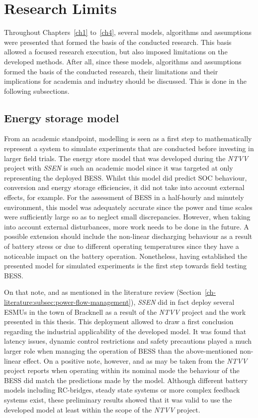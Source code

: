 \section{Research Limits}
\label{ch-conclusions:sec:research-limits}

Throughout Chapters~\ref{ch1} to~\ref{ch4}, several models, algorithms and assumptions were presented that formed the basis of the conducted research.
This basis allowed a focused research execution, but also imposed limitations on the developed methods.
After all, since these models, algorithms and assumptions formed the basis of the conducted research, their limitations and their implications for academia and industry should be discussed.
This is done in the following subsections.

\subsection{Energy storage model}

From an academic standpoint, modelling is seen as a first step to mathematically represent a system to simulate experiments that are conducted before investing in larger field trials.
The energy store model that was developed during the \textit{NTVV} project with \textit{SSEN} is such an academic model since it was targeted at only representing the deployed BESS.
Whilst this model did predict SOC behaviour, conversion and energy storage efficiencies, it did not take into account external effects, for example.
For the assessment of BESS in a half-hourly and minutely environment, this model was adequately accurate since the power and time scales were sufficiently large so as to neglect small discrepancies.
However, when taking into account external disturbances, more work needs to be done in the future.
A possible extension should include the non-linear discharging behaviour as a result of battery stress or due to different operating temperatures since they have a noticeable impact on the battery operation.
Nonetheless, having established the presented model for simulated experiments is the first step towards field testing BESS.

On that note, and as mentioned in the literature review (Section~\ref{ch-literature:subsec:power-flow-management}), \textit{SSEN} did in fact deploy several ESMUs in the town of Bracknell as a result of the \textit{NTVV} project and the work presented in this thesis.
This deployment allowed to draw a first conclusion regarding the industrial applicability of the developed model.
It was found that latency issues, dynamic control restrictions and safety precautions played a much larger role when managing the operation of BESS than the above-mentioned non-linear effect.
On a positive note, however, and as may be taken from the \textit{NTVV} project reports \cite{NTVV9.8a} when operating within its nominal mode the behaviour of the BESS did match the predictions made by the model.
Although different battery models including RC-bridges, steady state systems or more complex feedback systems exist, these preliminary results showed that it was valid to use the developed model at least within the scope of the \textit{NTVV} project.

